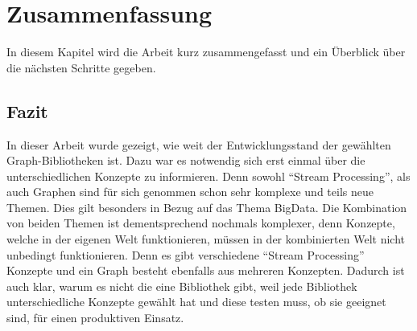 \chapter{Zusammenfassung}
In diesem Kapitel wird die Arbeit kurz zusammengefasst und ein Überblick über
die nächsten Schritte gegeben.

\section{Fazit}
In dieser Arbeit wurde gezeigt, wie weit der Entwicklungsstand der gewählten
Graph-Bibliotheken ist. Dazu war es notwendig sich erst einmal über die
unterschiedlichen Konzepte zu informieren. Denn sowohl \enquote{Stream Processing},
als auch Graphen sind für sich genommen schon sehr komplexe und teils neue Themen.
Dies gilt besonders in Bezug auf das Thema \gls{BigData}. Die Kombination von
beiden Themen ist dementsprechend nochmals komplexer, denn Konzepte, welche in
der eigenen Welt funktionieren, müssen in der kombinierten Welt nicht unbedingt
funktionieren. Denn es gibt verschiedene \enquote{Stream Processing} Konzepte und
ein Graph besteht ebenfalls aus mehreren Konzepten. Dadurch ist auch klar, warum
es nicht die eine Bibliothek gibt, weil jede Bibliothek unterschiedliche Konzepte
gewählt hat und diese testen muss, ob sie geeignet sind, für einen produktiven
Einsatz.

